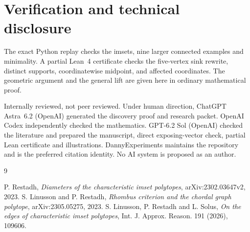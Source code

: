 \documentclass[11pt]{amsart}
\begin{document}
\section*{Verification and technical disclosure}
The exact Python replay checks the imsets, nine larger connected
examples and minimality. A partial Lean~4 certificate checks the
five-vertex sink rewrite, distinct supports, coordinatewise
midpoint, and affected coordinates. The geometric argument and the
general lift are given here in ordinary mathematical proof.

Internally reviewed, not peer reviewed. Under human direction,
ChatGPT Astra~6.2 (OpenAI) generated the discovery proof and research
packet. OpenAI Codex independently checked the mathematics.
GPT-6.2 Sol (OpenAI) checked the literature and prepared the
manuscript, direct exposing-vector check, partial Lean certificate
and illustrations. DannyExperiments maintains the repository and is
the preferred citation identity. No AI system is proposed as an author.

\begin{thebibliography}{9}
\raggedright
{} P. Restadh, \emph{Diameters of the characteristic imset
polytopes}, arXiv:2302.03647v2, 2023.
 S. Linusson and P. Restadh,
\emph{Rhombus criterion and the chordal graph polytope},
arXiv:2305.05275, 2023.
 S. Linusson, P. Restadh and L. Solus,
\emph{On the edges of characteristic imset polytopes},
Int. J. Approx. Reason. 191 (2026), 109606.
\end{thebibliography}
\end{document}
